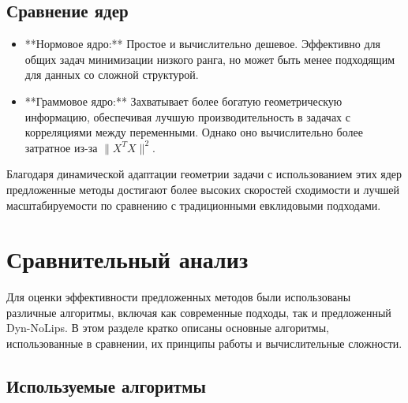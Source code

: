 \documentclass[a4paper,11pt]{article}
\begin{document}
\subsection{Сравнение ядер}
\begin{itemize}
    \item **Нормовое ядро:** Простое и вычислительно дешевое. Эффективно для общих задач минимизации низкого ранга, но может быть менее подходящим для данных со сложной структурой.
    \item **Граммовое ядро:** Захватывает более богатую геометрическую информацию, обеспечивая лучшую производительность в задачах с корреляциями между переменными. Однако оно вычислительно более затратное из-за \(\|X^TX\|^2\).
\end{itemize}

Благодаря динамической адаптации геометрии задачи с использованием этих ядер предложенные методы достигают более высоких скоростей сходимости и лучшей масштабируемости по сравнению с традиционными евклидовыми подходами.

\section{Сравнительный анализ}

Для оценки эффективности предложенных методов были использованы различные алгоритмы,
включая как современные подходы, так и предложенный Dyn-NoLips. В этом разделе кратко описаны
основные алгоритмы, использованные в сравнении, их принципы работы и вычислительные сложности.

\subsection{Используемые алгоритмы}
\end{document}
